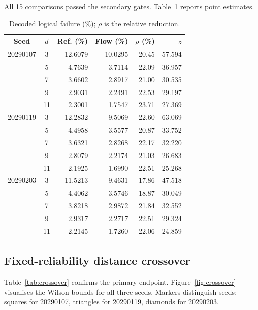 \documentclass[11pt]{article}
\begin{document}
All 15 comparisons passed the secondary gates. Table~\ref{tab:fixed} reports point estimates.

\begin{table}[htbp]
\centering
\caption{Decoded logical failure (\%); \(\rho\) is the relative reduction.}
\label{tab:fixed}
\small
\begin{tabular}{ccrrrr}
\toprule
Seed & \(d\) & Ref. (\%) & Flow (\%) & \(\rho\) (\%) & \(z\) \\
\midrule
20290107 & 3  & 12.6079 & 10.0295 & 20.45 & 57.594 \\
         & 5  &  4.7639 &  3.7114 & 22.09 & 36.957 \\
         & 7  &  3.6602 &  2.8917 & 21.00 & 30.535 \\
         & 9  &  2.9031 &  2.2491 & 22.53 & 29.197 \\
         & 11 &  2.3001 &  1.7547 & 23.71 & 27.369 \\
\midrule
20290119 & 3  & 12.2832 &  9.5069 & 22.60 & 63.069 \\
         & 5  &  4.4958 &  3.5577 & 20.87 & 33.752 \\
         & 7  &  3.6321 &  2.8268 & 22.17 & 32.220 \\
         & 9  &  2.8079 &  2.2174 & 21.03 & 26.683 \\
         & 11 &  2.1925 &  1.6990 & 22.51 & 25.268 \\
\midrule
20290203 & 3  & 11.5213 &  9.4631 & 17.86 & 47.518 \\
         & 5  &  4.4062 &  3.5746 & 18.87 & 30.049 \\
         & 7  &  3.8218 &  2.9872 & 21.84 & 32.552 \\
         & 9  &  2.9317 &  2.2717 & 22.51 & 29.324 \\
         & 11 &  2.2145 &  1.7260 & 22.06 & 24.859 \\
\bottomrule
\end{tabular}
\end{table}

\subsection{Fixed-reliability distance crossover}

Table~\ref{tab:crossover} confirms the primary endpoint. Figure~\ref{fig:crossover} visualises the Wilson bounds for all three seeds. Markers distinguish seeds: squares for 20290107, triangles for 20290119, diamonds for 20290203.
\end{document}
